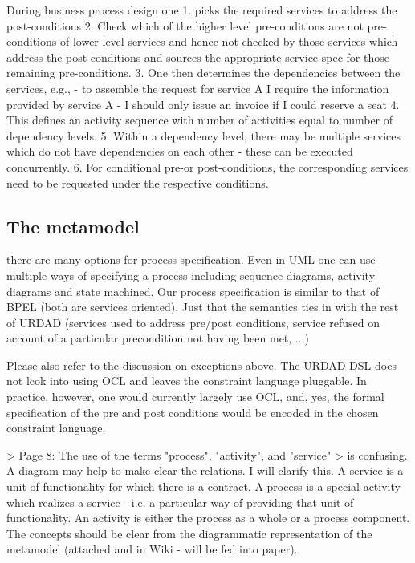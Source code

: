 During business process design one
  1. picks the required services to address the post-conditions
  2. Check which of the higher level pre-conditions are not pre-conditions of lower level services and hence not checked by those services which address the post-conditions and sources the appropriate service spec for those remaining pre-conditions.
  3. One then determines the dependencies between the services, e.g., 
    - to assemble the request for service A I require the information provided by service A
    - I should only issue an invoice if I could reserve a seat
  4. This defines an activity sequence with number of activities equal to number of dependency levels.
  5. Within a dependency level, there may be multiple services which do not have dependencies on each other - these can be executed concurrently.
  6. For conditional pre-or post-conditions, the corresponding services need to be requested under the respective conditions.

\subsection{The metamodel}








there are many options for process specification. Even in UML one can use multiple ways of specifying a process including sequence diagrams, activity diagrams and state machined. Our process specification is similar to that of BPEL (both are services oriented). Just that the semantics ties in with the rest of URDAD (services used to address pre/post conditions, service refused on account of a particular precondition not having been met, ...)

Please also refer to the discussion on exceptions above. The URDAD DSL does not lcok into using OCL and leaves the constraint language pluggable. In practice, however, one would currently largely use OCL, and, yes, the formal specification of the pre and post conditions would be encoded in the chosen constraint language.

> Page 8: The use of the terms "process", "activity", and "service"
> is confusing. A diagram may help to make clear the relations.
I will clarify this. A service is a unit of functionality for which there is a contract. A process is a special activity which realizes a service - i.e. a particular way of providing that unit of functionality. An activity is either the process as a whole or a process component. The concepts should be clear from the diagrammatic representation of the metamodel (attached and in Wiki - will be fed into paper).

